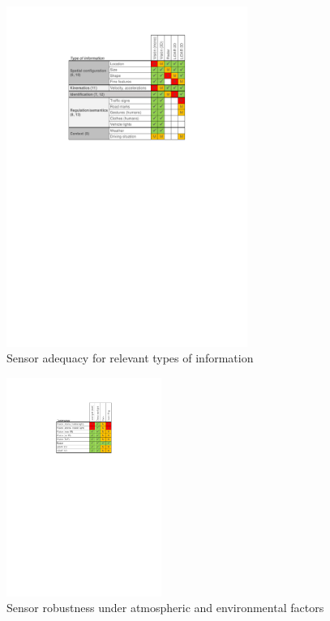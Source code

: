 \begin{figure}[h]
    \centering
    \includegraphics[width=0.7\textwidth]{"img/information_types_sensors"}
    \caption{Sensor adequacy for relevant types of information}
    \label{fig:information_vs_sensors}
\end{figure}

\begin{figure}[h]
    \centering
    \includegraphics[width=0.45\textwidth]{"img/sensors_atmospheric_conditions"}
    \caption{Sensor robustness under atmospheric and environmental factors}
    \label{fig:radar-freqband}
\end{figure}


